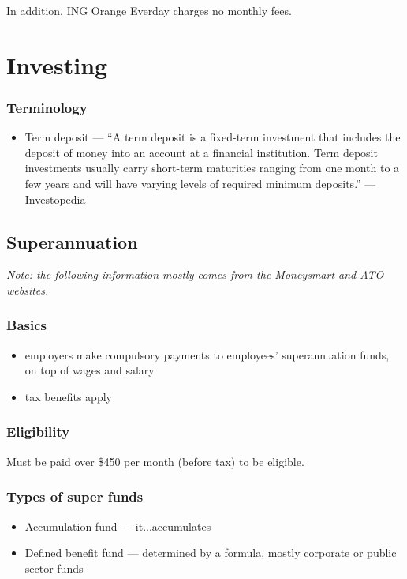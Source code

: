 \documentclass[oneside]{book}
\begin{document}
In addition, ING Orange Everday charges no monthly fees.

\section{Investing}

\subsubsection{Terminology}
\begin{itemize}
	\item Term deposit --- ``A term deposit is a fixed-term investment that includes the deposit of money into an account at a financial institution. Term deposit investments usually carry short-term maturities ranging from one month to a few years and will have varying levels of required minimum deposits.'' --- Investopedia \cite{investopedia_term_deposit}
\end{itemize}

\subsection{Superannuation}

\textit{Note: the following information mostly comes from the Moneysmart \cite{moneysmart_super} and ATO \cite{ato_super} websites.}

\subsubsection{Basics}
\begin{itemize}
	\item employers make compulsory payments to employees' superannuation funds, on top of wages and salary
	\item tax benefits apply
\end{itemize}

\subsubsection{Eligibility}
Must be paid over \$450 per month (before tax) to be eligible.

\subsubsection{Types of super funds}
\begin{itemize}
	\item Accumulation fund --- it...accumulates
	\item Defined benefit fund --- determined by a formula, mostly corporate or public sector funds
\end{itemize}
\end{document}
